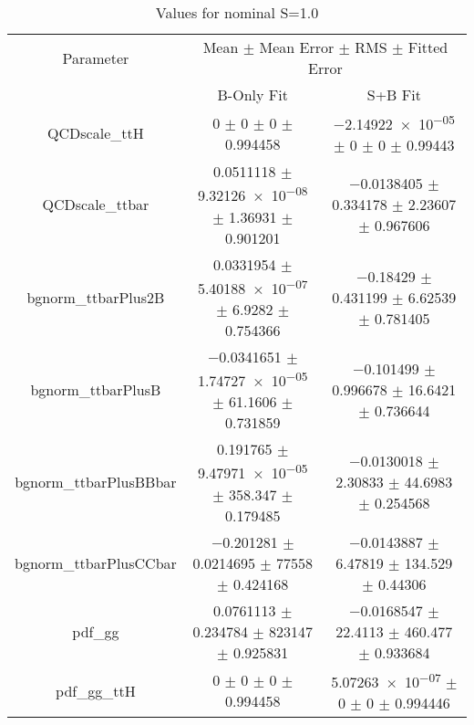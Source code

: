 \begin{table}
\centering
\caption{Values for nominal S=1.0}
\begin{tabular}{ccc}
\toprule
Parameter & \multicolumn{2}{c}{Mean $\pm$ Mean Error $\pm$ RMS $\pm$ Fitted Error}\\
 & B-Only Fit & S+B Fit\\
\midrule
QCDscale\_ttH & \num{0} $\pm$ \num{0} $\pm$ \num{0} $\pm$ \num{0.994458} & \num{-2.14922e-05} $\pm$ \num{0} $\pm$ \num{0} $\pm$ \num{0.99443}\\
QCDscale\_ttbar & \num{0.0511118} $\pm$ \num{9.32126e-08} $\pm$ \num{1.36931} $\pm$ \num{0.901201} & \num{-0.0138405} $\pm$ \num{0.334178} $\pm$ \num{2.23607} $\pm$ \num{0.967606}\\
bgnorm\_ttbarPlus2B & \num{0.0331954} $\pm$ \num{5.40188e-07} $\pm$ \num{6.9282} $\pm$ \num{0.754366} & \num{-0.18429} $\pm$ \num{0.431199} $\pm$ \num{6.62539} $\pm$ \num{0.781405}\\
bgnorm\_ttbarPlusB & \num{-0.0341651} $\pm$ \num{1.74727e-05} $\pm$ \num{61.1606} $\pm$ \num{0.731859} & \num{-0.101499} $\pm$ \num{0.996678} $\pm$ \num{16.6421} $\pm$ \num{0.736644}\\
bgnorm\_ttbarPlusBBbar & \num{0.191765} $\pm$ \num{9.47971e-05} $\pm$ \num{358.347} $\pm$ \num{0.179485} & \num{-0.0130018} $\pm$ \num{2.30833} $\pm$ \num{44.6983} $\pm$ \num{0.254568}\\
bgnorm\_ttbarPlusCCbar & \num{-0.201281} $\pm$ \num{0.0214695} $\pm$ \num{77558} $\pm$ \num{0.424168} & \num{-0.0143887} $\pm$ \num{6.47819} $\pm$ \num{134.529} $\pm$ \num{0.44306}\\
pdf\_gg & \num{0.0761113} $\pm$ \num{0.234784} $\pm$ \num{823147} $\pm$ \num{0.925831} & \num{-0.0168547} $\pm$ \num{22.4113} $\pm$ \num{460.477} $\pm$ \num{0.933684}\\
pdf\_gg\_ttH & \num{0} $\pm$ \num{0} $\pm$ \num{0} $\pm$ \num{0.994458} & \num{5.07263e-07} $\pm$ \num{0} $\pm$ \num{0} $\pm$ \num{0.994446}\\
\bottomrule
\end{tabular}
\end{table}